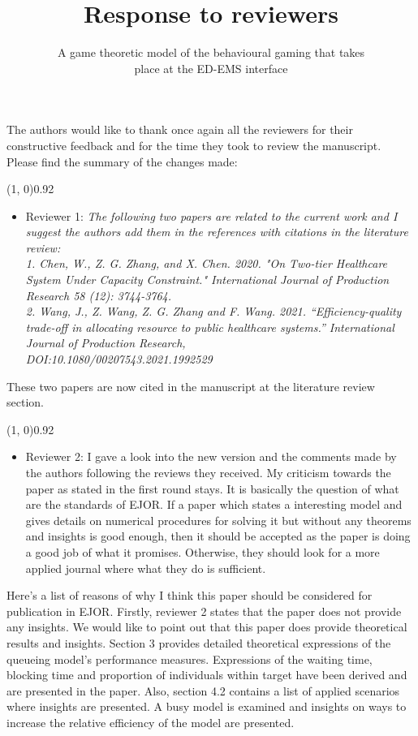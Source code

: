 \documentclass{article}
\title{Response to reviewers}
\author{A game theoretic model of the behavioural gaming that takes \\
place at the ED-EMS interface}
\begin{document}
    \maketitle

    The authors would like to thank once again all the reviewers for their
    constructive feedback and for
    the time they took to review the manuscript.
    Please find the summary of the changes made:


    \line(1, 0){0.92\textwidth}
    \begin{itemize}
        \item Reviewer 1: \textit{The following two papers are related to the
        current work and I suggest the authors add them in the references with
        citations in the literature review: \\
        1. Chen, W., Z. G. Zhang, and X. Chen. 2020. "On Two-tier Healthcare
        System Under Capacity Constraint." International Journal of Production
        Research 58 (12): 3744-3764. \\
        2. Wang, J., Z. Wang, Z. G. Zhang and F. Wang. 2021.
        ``Efficiency-quality trade-off in allocating resource to public
        healthcare systems.'' International Journal of Production Research, \\
        DOI:10.1080/00207543.2021.1992529}
    \end{itemize}

    These two papers are now cited in the manuscript at the literature review
    section.

    \line(1, 0){0.92\textwidth}
    \begin{itemize}
        \item Reviewer 2: I gave a look into the new version and the comments
        made by the authors following the reviews they received.
        My criticism towards the paper as stated in the first round stays.
        It is basically the question of what are the standards of EJOR.
        If a paper which states a interesting model and gives details on
        numerical procedures for solving it but without any theorems and
        insights is good enough, then it should be accepted as the paper is
        doing a good job of what it promises.
        Otherwise, they should look for a more applied journal where what they
        do is sufficient.
    \end{itemize}

    Here's a list of reasons of why I think this paper should be considered for
    publication in EJOR.
    Firstly, reviewer 2 states that the paper does not provide any insights.
    We would like to point out that this paper does provide theoretical results
    and insights.
    Section 3 provides detailed theoretical expressions of the queueing model's
    performance measures.
    Expressions of the waiting time, blocking time and proportion of
    individuals within target have been derived and are presented in the paper.
    Also, section 4.2 contains a list of applied scenarios where insights 
    are presented.
    A busy model is examined and insights on ways to increase the relative
    efficiency of the model are presented.
\end{document}
